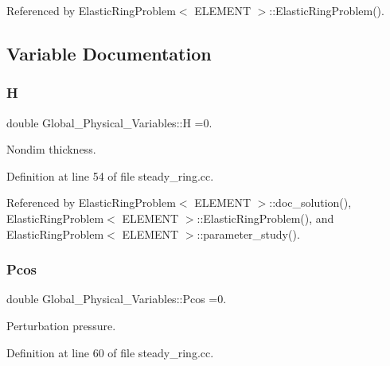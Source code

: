 Referenced by Elastic\+Ring\+Problem$<$ E\+L\+E\+M\+E\+N\+T $>$\+::\+Elastic\+Ring\+Problem().



\subsection{Variable Documentation}
\mbox{\label{namespaceGlobal__Physical__Variables_af6e07423e22c0991084d9a2f43727805}} 
\subsubsection{\texorpdfstring{H}{H}}
{\footnotesize\ttfamily double Global\+\_\+\+Physical\+\_\+\+Variables\+::H =0.}



Nondim thickness. 



Definition at line 54 of file steady\+\_\+ring.\+cc.



Referenced by Elastic\+Ring\+Problem$<$ E\+L\+E\+M\+E\+N\+T $>$\+::doc\+\_\+solution(), Elastic\+Ring\+Problem$<$ E\+L\+E\+M\+E\+N\+T $>$\+::\+Elastic\+Ring\+Problem(), and Elastic\+Ring\+Problem$<$ E\+L\+E\+M\+E\+N\+T $>$\+::parameter\+\_\+study().

\mbox{\label{namespaceGlobal__Physical__Variables_ab55734aaa66260cd9d4bf68a4ecafdd5}} 
\subsubsection{\texorpdfstring{Pcos}{Pcos}}
{\footnotesize\ttfamily double Global\+\_\+\+Physical\+\_\+\+Variables\+::\+Pcos =0.}



Perturbation pressure. 



Definition at line 60 of file steady\+\_\+ring.\+cc.



